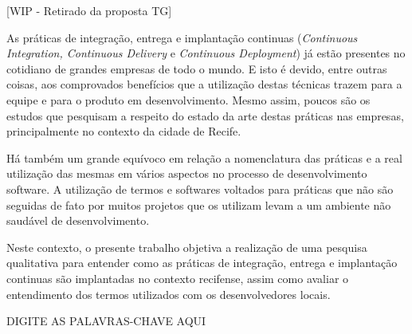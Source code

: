 \resumo

[WIP - Retirado da proposta TG]

As práticas de integração, entrega e implantação continuas (\emph{Continuous Integration, Continuous Delivery} e \emph{Continuous Deployment}) já estão presentes no cotidiano de grandes empresas de todo o mundo. E isto é devido, entre outras coisas, aos comprovados benefícios que a utilização destas técnicas trazem para a equipe e para o produto em desenvolvimento. Mesmo assim, poucos são os estudos que pesquisam a respeito do estado da arte destas práticas nas empresas, principalmente no contexto da cidade de Recife. 

Há também um grande equívoco em relação a nomenclatura das práticas e a real utilização das mesmas em vários aspectos no processo de desenvolvimento software. A utilização de termos e softwares voltados para práticas que não são seguidas de fato por muitos projetos que os utilizam levam a um ambiente não saudável de desenvolvimento. 

Neste contexto, o presente trabalho objetiva a realização de uma pesquisa qualitativa para entender como as práticas de integração, entrega e implantação continuas são implantadas no contexto recifense, assim como avaliar o entendimento dos termos utilizados com os desenvolvedores locais.

\begin{keywords}
    DIGITE AS PALAVRAS-CHAVE AQUI
\end{keywords}
